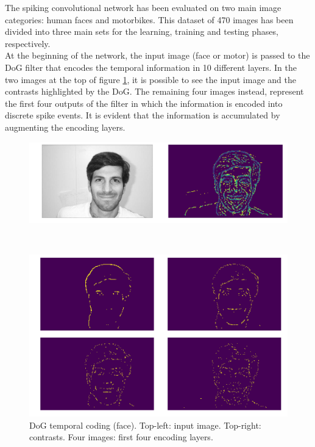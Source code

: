 \documentclass[11pt,a4paper]{scrartcl}
\begin{document}
The spiking convolutional network has been evaluated on two main image categories: human faces and motorbikes. This dataset of 470 images has been divided into three main sets for the learning, training and testing phases, respectively.\\
At the beginning of the network, the input image (face or motor) is passed to the DoG filter that encodes the temporal information in 10 different layers. In the two images at the top of figure \ref{fig:face}, it is possible to see the input image and the contrasts highlighted by the DoG. The remaining four images instead, represent the first four outputs of the filter in which the information is encoded into discrete spike events. It is evident that the information is accumulated by augmenting the encoding layers.
\begin{figure}[!h]
	\centering
	\begin{minipage}[b]{0.685\textwidth}
		\includegraphics[width=\textwidth]{images/face_temp}
	\end{minipage}
	\\
	\begin{minipage}[b]{0.685\textwidth}
		\includegraphics[width=\textwidth]{images/face_dog_out}
	\end{minipage}
	\caption{DoG temporal coding (face). Top-left: input image. Top-right: contrasts. Four images: first four encoding layers.}
	\label{fig:face}
\end{figure}\\
\end{document}
